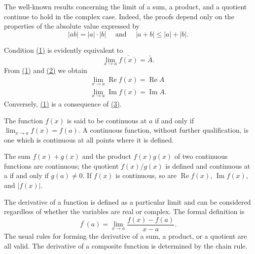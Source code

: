 The well-known results concerning the limit of a sum, a product, and a quotient continue to hold in the complex case. Indeed, the proofs depend only on the properties of the absolute value expressed by
\begin{equation*}
| a b | = | a | \cdot | b | \quad \text { and } \quad | a + b | \leq | a | + | b |.
\end{equation*}
\begingroup\renewcommand{\thefootnote}{}\endgroup

Condition \hyperref[eq:2.1]{(1)} is evidently equivalent to
\begin{equation*}
\lim _ {x \rightarrow a} \overline {{{{f (x)}}}} = \bar {A}.\tag{2}\label{eq:2.2}
\end{equation*}
From \hyperref[eq:2.1]{(1)} and \hyperref[eq:2.2]{(2)} we obtain
\begin{equation*}
\begin{array}{l} \lim _ {x \to a} \operatorname{Re} f (x) = \operatorname{Re} A \\ \lim _ {x \to a} \operatorname{Im} f (x) = \operatorname{Im} A. \end{array}\tag{3}\label{eq:2.3}
\end{equation*}
Conversely, \hyperref[eq:2.1]{(1)} is a consequence of \hyperref[eq:2.3]{(3)}.

The function $f(x)$ is said to be continuous at $a$ if and only if $\lim_{x \to a} f(x) = f(a)$. A continuous function, without further qualification, is one which is continuous at all points where it is defined.

The sum $f(x) + g(x)$ and the product $f(x)g(x)$ of two continuous functions are continuous; the quotient $f(x)/g(x)$ is defined and continuous at a if and only if $g(a) \neq 0$. If $f(x)$ is continuous, so are $\operatorname{Re} f(x)$, $\operatorname{Im} f(x)$, and $|f(x)|$.

The derivative of a function is defined as a particular limit and can be considered regardless of whether the variables are real or complex. The formal definition is
\begin{equation*}
f ^ {\prime} (a) = \lim _ {x \rightarrow a} \frac {f (x) - f (a)}{x - a}.\tag{4}\label{eq:2.4}
\end{equation*}
The usual rules for forming the derivative of a sum, a product, or a quotient are all valid. The derivative of a composite function is determined by the chain rule.

